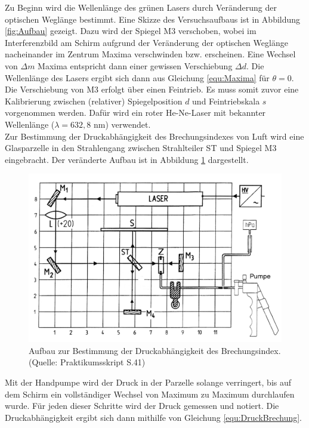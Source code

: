 \documentclass[12pt,a4paper]{article}
\begin{document}
Zu Beginn wird die Wellenlänge des grünen Lasers durch Veränderung der optischen Weglänge bestimmt. Eine Skizze des Versuchsaufbaus ist in Abbildung \ref{fig:Aufbau} gezeigt.
Dazu wird der Spiegel M3 verschoben, wobei im Interferenzbild am Schirm aufgrund der Veränderung der optischen Weglänge nacheinander im Zentrum Maxima verschwinden bzw. erscheinen. Eine Wechsel von $\Delta m$ Maxima entspricht dann einer gewissen Verschiebung $\Delta d$. Die Wellenlänge des Lasers 
ergibt sich dann aus Gleichung \ref{equ:Maxima} für $\theta = 0$.\\

Die Verschiebung von M3 erfolgt über einen Feintrieb. Es muss somit zuvor eine Kalibrierung zwischen (relativer) Spiegelposition $d$ und Feintriebskala $s$ vorgenommen werden. Dafür wird ein roter He-Ne-Laser mit bekannter Wellenlänge ($\lambda = 632,8$ nm) verwendet.\\

Zur Bestimmung der Druckabhängigkeit des Brechungsindexes von Luft wird eine Glasparzelle in den Strahlengang zwischen Strahlteiler ST und Spiegel M3 eingebracht. Der veränderte Aufbau ist in Abbildung \ref{fig:AufbauDruck} dargestellt.

\begin{figure}
\begin{center}
\includegraphics[scale=0.6]{Bilder/AufbauDruck.png}
\caption{Aufbau zur Bestimmung der Druckabhängigkeit des Brechungsindex. (Quelle: Praktikumsskript S.41)}
\label{fig:AufbauDruck}
\end{center}
\end{figure}

Mit der Handpumpe wird der Druck in der Parzelle solange verringert, bis auf dem Schirm ein vollständiger Wechsel von Maximum zu Maximum durchlaufen wurde. Für jeden dieser Schritte wird der Druck gemessen und notiert. Die Druckabhängigkeit ergibt sich dann mithilfe von Gleichung \ref{equ:DruckBrechung}.
\end{document}
